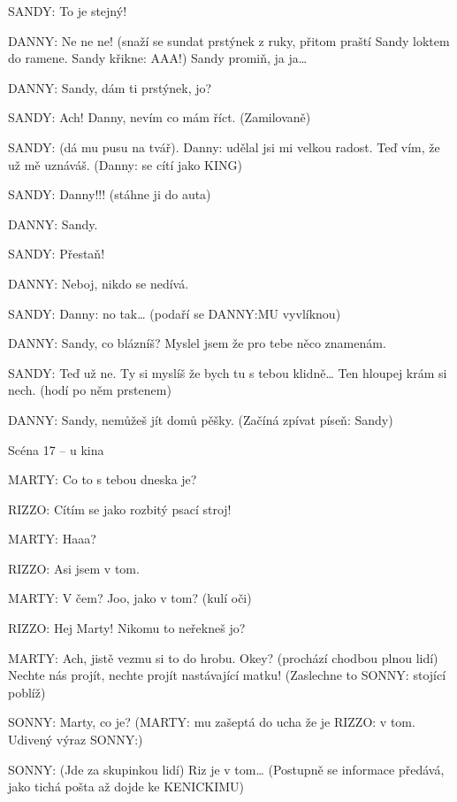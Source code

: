 \rep SANDY:        To je stejný!

\rep DANNY:        Ne ne ne! (snaží se sundat prstýnek z ruky, přitom praští Sandy loktem         do ramene. Sandy křikne: AAA!) Sandy promiň, ja ja…

\rep DANNY:        Sandy, dám ti prstýnek, jo?

\rep SANDY:        Ach! Danny, nevím co mám říct. (Zamilovaně)

\rep SANDY:        (dá mu pusu na tvář). \rep Danny: udělal jsi mi velkou radost. Teď vím, že už mě uznáváš. (\rep Danny: se cítí jako KING)

\rep SANDY:        Danny!!! (stáhne ji do auta)

\rep DANNY:        Sandy. 

\rep SANDY:        Přestaň!

\rep DANNY:        Neboj, nikdo se nedívá. 

\rep SANDY:        \rep Danny: no tak… (podaří se \rep DANNY:MU vyvlíknou)

\rep DANNY:        Sandy, co blázníš? Myslel jsem že pro tebe něco znamenám. 

\rep SANDY:        Teď už ne. Ty si myslíš že bych tu s tebou klidně… Ten hloupej krám si         nech. (hodí po něm prstenem)

\rep DANNY:        Sandy, nemůžeš jít domů pěšky. (Začíná zpívat píseň: Sandy)





 Scéna 17  – u kina 

\rep MARTY:        Co to s tebou dneska je?

\rep RIZZO:        Cítím se jako rozbitý psací stroj! 

\rep MARTY:        Haaa?

\rep RIZZO:        Asi jsem v tom.

\rep MARTY:        V čem? Joo, jako  v tom? (kulí oči)

\rep RIZZO:        Hej Marty! Nikomu to neřekneš jo?

\rep MARTY:        Ach, jistě vezmu si to do hrobu. Okey? (prochází chodbou plnou lidí)         Nechte nás projít, nechte projít nastávající matku! (Zaslechne to         \rep SONNY: stojící poblíž)

\rep SONNY:        Marty, co je? (\rep MARTY: mu zašeptá do ucha že je \rep RIZZO: v tom. Udivený         výraz \rep SONNY:) 

\rep SONNY:        (Jde za skupinkou lidí) Riz je v tom… (Postupně se informace předává,         jako tichá pošta až dojde ke KENICKIMU)

